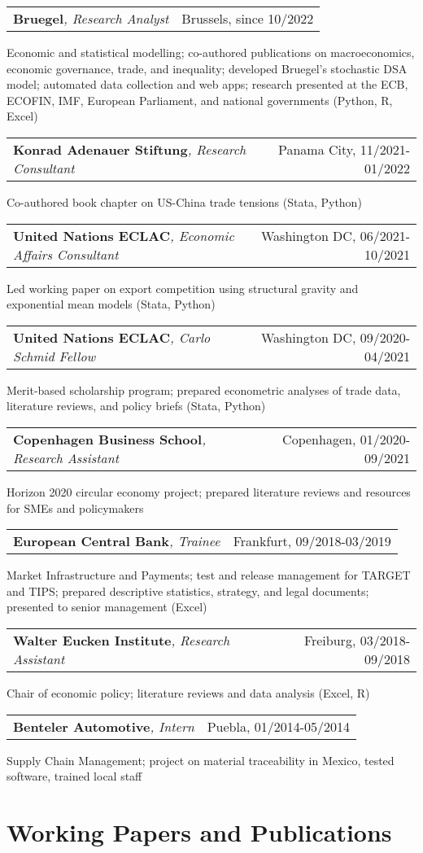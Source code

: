 \documentclass[A4,11pt]{article}
\makeatletter
\newcommand{\Subheading}[4]{   
    \begin{tabular*}{\textwidth}[t]{@{}l @{\extracolsep{\fill}} r@{}}
        \textbf{#1}\textit{\small #2} & \footnotesize #3 \\
    \end{tabular*}
    \small #4 
    \vspace{7pt}
}
\makeatother
\begin{document}
    \Subheading
        {Bruegel}{, Research Analyst}{Brussels, since 10/2022}
        {Economic and statistical modelling; co-authored publications on macroeconomics, 
        economic governance, trade, and inequality; 
        developed Bruegel's stochastic DSA model; 
        automated data collection and web apps;
        research presented at the ECB, ECOFIN, IMF, European Parliament, and national governments 
        (Python, R, Excel)}{}

    \Subheading
        {Konrad Adenauer Stiftung}{, Research Consultant}{Panama City, 11/2021-01/2022}
        {Co-authored book chapter on US-China trade tensions 
        (Stata, Python)}  

    \Subheading
        {United Nations ECLAC}{, Economic Affairs Consultant}{Washington DC, 06/2021-10/2021}
        {Led working paper on export competition using structural gravity 
        and exponential mean models (Stata, Python)}

    \Subheading
        {United Nations ECLAC}{, Carlo Schmid Fellow}{Washington DC, 09/2020-04/2021}
        {Merit-based scholarship program; prepared econometric analyses of trade data, 
        literature reviews, and policy briefs (Stata, Python)}

    \Subheading
        {Copenhagen Business School}{, Research Assistant}{Copenhagen, 01/2020-09/2021}
        {Horizon 2020 circular economy project; prepared literature reviews and 
        resources for SMEs and policymakers}

    \Subheading
        {European Central Bank}{, Trainee}{Frankfurt, 09/2018-03/2019}
        {Market Infrastructure and Payments; test and release management for TARGET 
        and TIPS; prepared descriptive statistics, strategy, and legal documents;
        presented to senior management (Excel)}

    \Subheading
        {Walter Eucken Institute}{, Research Assistant}{Freiburg, 03/2018-09/2018}
        {Chair of economic policy; literature reviews and data analysis (Excel, R)}

    \Subheading
        {Benteler Automotive}{, Intern}{Puebla, 01/2014-05/2014}
        {Supply Chain Management; project on material traceability in Mexico, tested software, 
        trained local staff}

\newpage

\section{Working Papers and Publications}
\setlength{}
\begin{refsection}
\nocite{*}
\printbibliography[heading=none]
\end{refsection}
\end{document}
